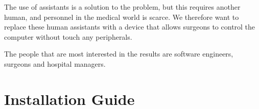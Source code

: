 \documentclass[a4paper]{article}
\begin{document}
  The use of assistants is a solution to the problem, but this requires another
  human, and personnel in the medical world is scarce. We therefore want to
  replace these human assistants with a device that allows surgeons to control
  the computer without touch any peripherals.

  The people that are most interested in the results are software engineers,
  surgeons and hospital managers.


  \section{Installation Guide}





\end{document}
